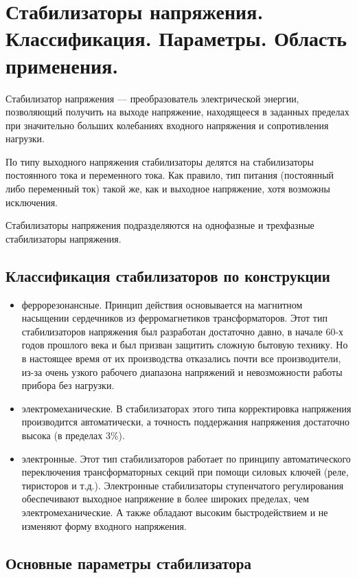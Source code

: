 \documentclass[unicode, 12pt, a4paper, oneside]{article}
\begin{document}
\section{Стабилизаторы напряжения. Классификация. Параметры. Область применения.}

Стабилизатор напряжения — преобразователь электрической энергии, позволяющий получить на выходе напряжение, находящееся в заданных пределах при значительно больших колебаниях входного напряжения и сопротивления нагрузки.

По типу выходного напряжения стабилизаторы делятся на стабилизаторы постоянного тока и переменного тока. Как правило, тип питания (постоянный либо переменный ток) такой же, как и выходное напряжение, хотя возможны исключения.

Стабилизаторы напряжения подразделяются на однофазные и трехфазные стабилизаторы напряжения.

\subsection*{Классификация стабилизаторов по конструкции}

\begin{itemize}
\item феррорезонансные. Принцип действия основывается на магнитном насыщении сердечников из ферромагнетиков трансформаторов. Этот тип стабилизаторов напряжения был разработан достаточно давно, в начале 60-х годов прошлого века и был призван защитить сложную бытовую технику. Но в настоящее время от их производства отказались почти все производители, из-за очень узкого рабочего диапазона напряжений и невозможности работы прибора без нагрузки.
\item электромеханические. В стабилизаторах этого типа корректировка напряжения производится автоматически, а точность поддержания напряжения достаточно высока (в пределах 3\%).
\item электронные. Этот тип стабилизаторов работает по принципу автоматического переключения трансформаторных секций при помощи силовых ключей (реле, тиристоров и т.д.). Электронные стабилизаторы ступенчатого регулирования обеспечивают выходное напряжение в более широких пределах, чем электромеханические. А также обладают высоким быстродействием и не изменяют форму входного напряжения.
\end{itemize}

\subsection*{Основные параметры стабилизатора}
\end{document}
